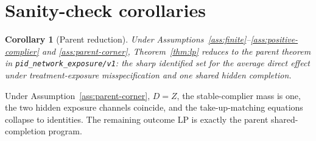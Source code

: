 \documentclass[11pt]{article}
\theoremstyle{definition}
\theoremstyle{plain}
\newtheorem{corollary}{Corollary}
\theoremstyle{remark}
\begin{document}
\section{Sanity-check corollaries}
\begin{corollary}[Parent reduction]\label{cor:parent}
Under Assumptions~\ref{ass:finite}--\ref{ass:positive-complier} and \ref{ass:parent-corner}, Theorem~\ref{thm:lp} reduces to the parent theorem in \texttt{pid\_network\_exposure/v1}: the sharp identified set for the average direct effect under treatment-exposure misspecification and one shared hidden completion.
\end{corollary}
Under Assumption~\ref{ass:parent-corner}, \(D=Z\), the stable-complier mass is one, the two hidden exposure channels coincide, and the take-up-matching equations collapse to identities. The remaining outcome LP is exactly the parent shared-completion program.
\end{document}
